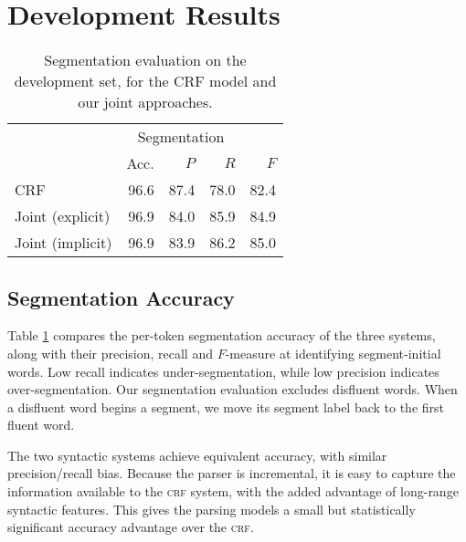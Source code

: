 \documentclass[11pt,letterpaper]{article}
\begin{document}
\section{Development Results}

\label{sec:results}

\begin{table}
    \centering
    \small
    \begin{tabular}{l|rrrr}
        \hline
               & \multicolumn{3}{c}{Segmentation} \\
               & Acc. & $P$ & $R$ & $F$ \\
        \hline
        CRF              & 96.6 & 87.4 & 78.0 & 82.4 \\
        Joint (explicit) & 96.9 & 84.0 & 85.9 & 84.9 \\
        Joint (implicit) & 96.9 & 83.9 & 86.2 & 85.0 \\
        \hline
    \end{tabular}
    \caption{\small Segmentation evaluation on the development set, for
    the CRF model and our joint approaches.\label{tab:sbd_eval}}
    \vspace*{-4em}
\end{table}

\subsection{Segmentation Accuracy}

Table \ref{tab:sbd_eval} compares the per-token segmentation accuracy of the
three systems, along with their precision, recall and $F$-measure at identifying
segment-initial words.  Low recall indicates under-segmentation, while low precision
indicates over-segmentation.  Our segmentation evaluation excludes disfluent words.
When a disfluent word begins a segment, we move its segment label back to the first
fluent word.


The two syntactic systems achieve equivalent accuracy, with similar precision/recall
bias.  Because the parser is incremental, it is easy to capture the information
available to the \textsc{crf} system, with the added advantage of long-range
syntactic features.  This gives the parsing models a small but statistically
significant accuracy advantage over the \textsc{crf}.
\end{document}
